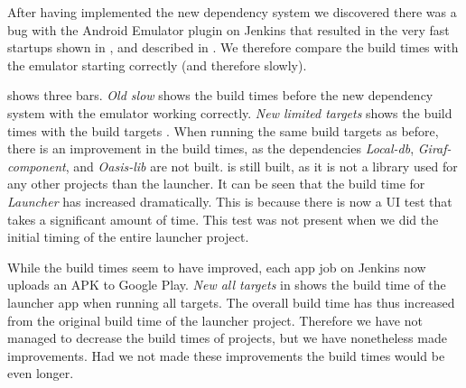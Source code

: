 After having implemented the new dependency system we discovered there was a bug with the Android Emulator plugin on Jenkins that resulted in the very fast startups shown in , and described in . We therefore compare the build times with the emulator starting correctly (and therefore slowly).

 shows three bars. \emph{Old slow} shows the build times before the new dependency system with the emulator working correctly. \emph{New limited targets} shows the build times with the build targets . When running the same build targets as before, there is an improvement in the build times, as the dependencies \emph{Local-db}, \emph{Giraf-component}, and \emph{Oasis-lib} are not built.  is still built, as it is not a library used for any other projects than the launcher. It can be seen that the build time for \emph{Launcher} has increased dramatically. This is because there is now a UI test that takes a significant amount of time. This test was not present when we did the initial timing of the entire launcher project.

While the build times seem to have improved, each app job on Jenkins now uploads an APK to Google Play. \emph{New all targets} in  shows the build time of the launcher app when running all targets. The overall build time has thus increased from the original build time of the launcher project. Therefore we have not managed to decrease the build times of projects, but we have nonetheless made improvements. Had we not made these improvements the build times would be even longer.

